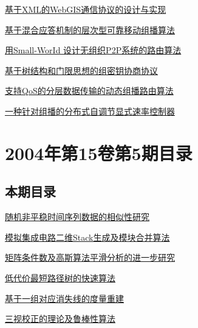 \documentclass[a4paper]{article}
\begin{document}
\href{http://www.jos.org.cn/ch/reader/download_pdf.aspx?file_no=20040612&year_id=2004&quarter_id=6&falg=1}{基于XML的WebGIS通信协议的设计与实现}

\href{http://www.jos.org.cn/ch/reader/download_pdf.aspx?file_no=20040613&year_id=2004&quarter_id=6&falg=1}{基于混合应答机制的层次型可靠移动组播算法}

\href{http://www.jos.org.cn/ch/reader/download_pdf.aspx?file_no=20040614&year_id=2004&quarter_id=6&falg=1}{用Small-WorId 设计无组织P2P系统的路由算法}

\href{http://www.jos.org.cn/ch/reader/download_pdf.aspx?file_no=20040615&year_id=2004&quarter_id=6&falg=1}{基于树结构和门限思想的组密钥协商协议}

\href{http://www.jos.org.cn/ch/reader/download_pdf.aspx?file_no=20040616&year_id=2004&quarter_id=6&falg=1}{支持QoS的分层数据传输的动态组播路由算法}

\href{http://www.jos.org.cn/ch/reader/download_pdf.aspx?file_no=20040617&year_id=2004&quarter_id=6&falg=1}{一种针对组播的分布式自调节显式速率控制器}


\section{\textbf{2004年第15卷第5期目录}}
\subsection{本期目录}
\href{http://www.jos.org.cn/ch/reader/download_pdf.aspx?file_no=20040501&year_id=2004&quarter_id=5&falg=1}{随机非平稳时间序列数据的相似性研究}

\href{http://www.jos.org.cn/ch/reader/download_pdf.aspx?file_no=20040502&year_id=2004&quarter_id=5&falg=1}{模拟集成电路二维Stack生成及模块合并算法}

\href{http://www.jos.org.cn/ch/reader/download_pdf.aspx?file_no=20040503&year_id=2004&quarter_id=5&falg=1}{矩阵条件数及高斯算法平滑分析的进一步研究}

\href{http://www.jos.org.cn/ch/reader/download_pdf.aspx?file_no=20040504&year_id=2004&quarter_id=5&falg=1}{低代价最短路径树的快速算法}

\href{http://www.jos.org.cn/ch/reader/download_pdf.aspx?file_no=20040505&year_id=2004&quarter_id=5&falg=1}{基于一组对应消失线的度量重建}

\href{http://www.jos.org.cn/ch/reader/download_pdf.aspx?file_no=20040506&year_id=2004&quarter_id=5&falg=1}{三视校正的理论及鲁棒性算法}
\end{document}

